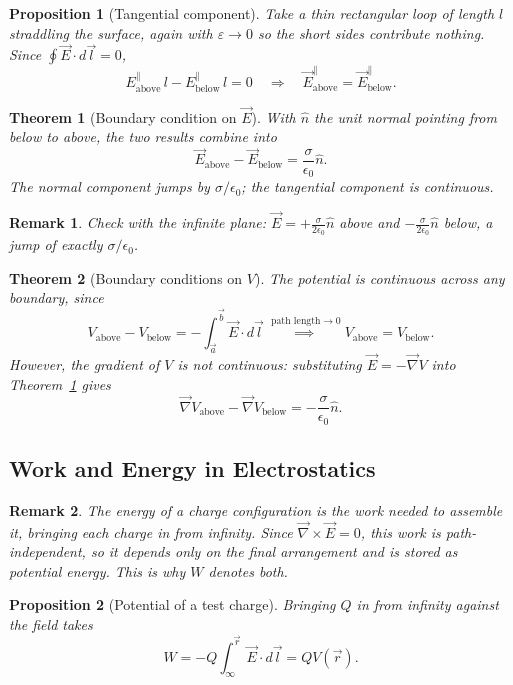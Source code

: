 \documentclass{article}
\newtheorem{theorem}{Theorem}
\newtheorem{remark}{Remark}
\newtheorem{proposition}{Proposition}
\begin{document}
\begin{proposition}[Tangential component]
    Take a thin rectangular loop of length $l$ straddling the surface, again with $\varepsilon \to 0$ so the short sides contribute nothing. Since $\oint\vec{E}\cdot d\vec{l} = 0$,
    \[E^{\parallel}_{\text{above}}\,l - E^{\parallel}_{\text{below}}\,l = 0 \quad\Longrightarrow\quad \vec{E}^{\parallel}_{\text{above}} = \vec{E}^{\parallel}_{\text{below}}.\]
\end{proposition}
\begin{theorem}[Boundary condition on $\vec{E}$]
    \label{BC-E}
    With $\hat{n}$ the unit normal pointing from below to above, the two results combine into
    \begin{equation}
        \vec{E}_{\text{above}} - \vec{E}_{\text{below}} = \frac{\sigma}{\epsilon_0}\hat{n}.
    \end{equation}
    The normal component jumps by $\sigma/\epsilon_0$; the tangential component is continuous.
\end{theorem}
\begin{remark}
    Check with the infinite plane: $\vec{E} = +\frac{\sigma}{2\epsilon_0}\hat{n}$ above and $-\frac{\sigma}{2\epsilon_0}\hat{n}$ below, a jump of exactly $\sigma/\epsilon_0$.
\end{remark}
\begin{theorem}[Boundary conditions on $V$]
    The potential is continuous across any boundary, since
    \[V_{\text{above}} - V_{\text{below}} = -\int_{\vec{a}}^{\vec{b}}\vec{E}\cdot d\vec{l} \overset{\text{ path length}\to 0}{\implies} V_{\text{above}} = V_{\text{below}}.\]
    However, the gradient of $V$ is not continuous: substituting $\vec{E} = -\vec{\nabla}V$ into Theorem~\ref{BC-E} gives
    \begin{equation}
        \vec{\nabla}V_{\text{above}} - \vec{\nabla}V_{\text{below}} = -\frac{\sigma}{\epsilon_0}\hat{n}.
    \end{equation}
\end{theorem}

\subsection{Work and Energy in Electrostatics}
\begin{remark}
    The energy of a charge configuration is the work needed to assemble it, bringing each charge in from infinity. Since $\vec{\nabla}\times\vec{E} = 0$, this work is path-independent, so it depends only on the final arrangement and is stored as potential energy. This is why $W$ denotes both.
\end{remark}
\begin{proposition}[Potential of a test charge]
    Bringing $Q$ in from infinity against the field takes
    \begin{equation}
        W = -Q\int_\infty^{\vec{r}}\vec{E}\cdot d\vec{l} = QV(\vec{r}).
    \end{equation}
\end{proposition}
\end{document}
